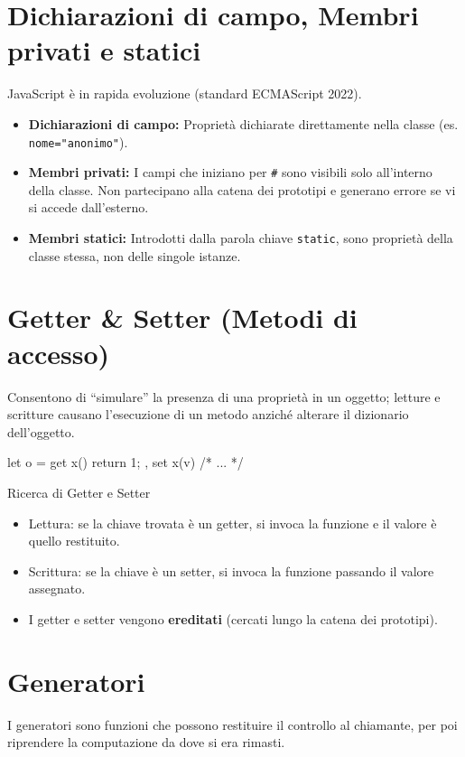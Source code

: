 \section{Dichiarazioni di campo, Membri privati e statici}

JavaScript è in rapida evoluzione (standard ECMAScript 2022).
\begin{itemize}
    \item \textbf{Dichiarazioni di campo:} Proprietà dichiarate direttamente nella classe (es. \texttt{nome="anonimo"}).
    \item \textbf{Membri privati:} I campi che iniziano per \texttt{\#} sono visibili solo all'interno della classe. Non partecipano alla catena dei prototipi e generano errore se vi si accede dall'esterno.
    \item \textbf{Membri statici:} Introdotti dalla parola chiave \texttt{static}, sono proprietà della classe stessa, non delle singole istanze.
\end{itemize}

\section{Getter \& Setter (Metodi di accesso)}
Consentono di ``simulare'' la presenza di una proprietà in un oggetto; letture e scritture causano l'esecuzione di un metodo anziché alterare il dizionario dell'oggetto.

\begin{jsbox}[title={Sintassi Getter e Setter}]
let o = {
  get x() { return 1; },
  set x(v) { /* ... */ }
}
\end{jsbox}

\begin{definition}{Ricerca di Getter e Setter}
\begin{itemize}
    \item Lettura: se la chiave trovata è un getter, si invoca la funzione e il valore è quello restituito.
    \item Scrittura: se la chiave è un setter, si invoca la funzione passando il valore assegnato.
    \item I getter e setter vengono \textbf{ereditati} (cercati lungo la catena dei prototipi).
\end{itemize}
\end{definition}

\section{Generatori}
I generatori sono funzioni che possono restituire il controllo al chiamante, per poi riprendere la computazione da dove si era rimasti.

